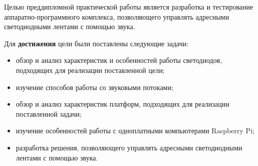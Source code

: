 Целью преддипломной практической работы является разработка и тестирование аппаратно-программного комплекса, позволяющего управлять адресными светодиодными лентами с помощью звука.

Для \textbf{достижения} цели были поставлены следующие задачи:

\begin{itemize}
  \item обзор и анализ характеристик и особенностей работы светодиодов, подходящих для реализации поставленной цели;
  \item изучение способов работы со звуковыми потоками;
  \item обзор и анализ характеристик платформ, подходящих для реализации поставленной задачи;
  \item изучение особенностей работы с одноплатными компьютерами Raspberry Pi;
  \item разработка решения, позволяющего управлять адресными светодиодными лентами с помощью звука.
\end{itemize}